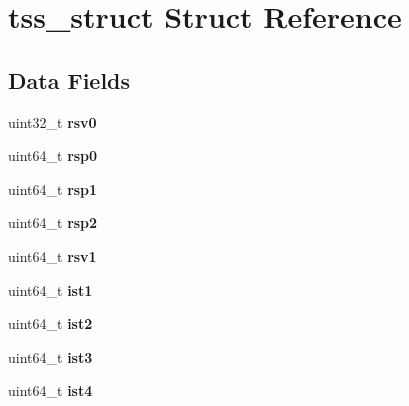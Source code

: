 \hypertarget{structtss__struct}{}\section{tss\+\_\+struct Struct Reference}
\label{structtss__struct}
\subsection*{Data Fields}
\begin{DoxyCompactItemize}
\item 
uint32\+\_\+t {\bfseries rsv0}\hypertarget{structtss__struct_a67136e2964d1a037a693d8b97e7df763}{}\label{structtss__struct_a67136e2964d1a037a693d8b97e7df763}

\item 
uint64\+\_\+t {\bfseries rsp0}\hypertarget{structtss__struct_a2a909cf5743915abba35a45201c599ac}{}\label{structtss__struct_a2a909cf5743915abba35a45201c599ac}

\item 
uint64\+\_\+t {\bfseries rsp1}\hypertarget{structtss__struct_a44f09807815c9daba6f6f0a00645753c}{}\label{structtss__struct_a44f09807815c9daba6f6f0a00645753c}

\item 
uint64\+\_\+t {\bfseries rsp2}\hypertarget{structtss__struct_a5cfd77863c9f8b155c4945f75db92e27}{}\label{structtss__struct_a5cfd77863c9f8b155c4945f75db92e27}

\item 
uint64\+\_\+t {\bfseries rsv1}\hypertarget{structtss__struct_a1392c1fb8dc707f2bb630d4aebb23785}{}\label{structtss__struct_a1392c1fb8dc707f2bb630d4aebb23785}

\item 
uint64\+\_\+t {\bfseries ist1}\hypertarget{structtss__struct_afed941aac7986c8e1d18a6e8f431aac9}{}\label{structtss__struct_afed941aac7986c8e1d18a6e8f431aac9}

\item 
uint64\+\_\+t {\bfseries ist2}\hypertarget{structtss__struct_ae025ae802a176e0cef191d5d3b981987}{}\label{structtss__struct_ae025ae802a176e0cef191d5d3b981987}

\item 
uint64\+\_\+t {\bfseries ist3}\hypertarget{structtss__struct_aea5dd70128936a513de66a487a0a194c}{}\label{structtss__struct_aea5dd70128936a513de66a487a0a194c}

\item 
uint64\+\_\+t {\bfseries ist4}\hypertarget{structtss__struct_a8543c9118750ffd8126c35ec2d65263f}{}\label{structtss__struct_a8543c9118750ffd8126c35ec2d65263f}


\end{DoxyCompactItemize}
